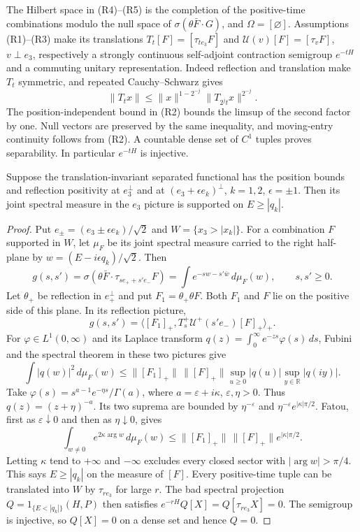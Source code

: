 \documentclass[11pt,letterpaper,reqno]{amsart}
\makeatletter
\theoremstyle{definition}
\newcommand{\ms@minorstart}{%
  \pushQED{\qed}\renewcommand{\qedsymbol}{$\blacksquare$}}
\newenvironment{proposition}[1][]{\ms@minorstart\ms@proposition[#1]}
  {\popQED\endms@proposition}
\theoremstyle{remark}
\makeatother
\begin{document}
The Hilbert space in (R4)--(R5) is the completion of the
positive-time combinations modulo the null space of
$\sigma(\theta\bar F\cdot G)$, and $\Omega=[\varnothing]$.
Assumptions (R1)--(R3) make its translations
$T_t[F]=[\tau_{te_3}F]$ and
$\mathcal U(v)[F]=[\tau_vF]$, $v\perp e_3$, respectively
a strongly continuous self-adjoint contraction semigroup
$e^{-tH}$ and a commuting unitary representation.
Indeed reflection and translation make $T_t$ symmetric,
and repeated Cauchy--Schwarz gives
\[
 \|T_tx\|\le\|x\|^{1-2^{-j}}
                    \|T_{2^jt}x\|^{2^{-j}}.
\]
The position-independent bound in (R2) bounds the limsup
of the second factor by one. Null vectors are preserved by the
same inequality, and moving-entry continuity follows
from (R2).  A countable dense set of $C^1$ tuples proves
separability.  In particular $e^{-tH}$ is injective.

\begin{proposition}[The two-plane spectral inequality]\label{C-389-28}
Suppose the translation-invariant separated functional has the
position bounds and reflection positivity at $e_3^\perp$ and
at $(e_3+\epsilon e_k)^\perp$, $k=1,2$, $\epsilon=\pm1$.
Then its joint spectral measure in the $e_3$ picture is
supported on $E\ge|q_k|$.
\end{proposition}
\begin{proof}
Put $e_\pm=(e_3\pm\epsilon e_k)/\sqrt2$ and
$W=\{x_3>|x_k|\}$. For a combination $F$ supported in $W$,
let $\mu_F$ be its joint spectral measure carried to the
right half-plane by $w=(E-i\epsilon q_k)/\sqrt2$. Then
\[
 g(s,s')=\sigma(\theta\bar F\cdot
                  \tau_{se_++s'e_-}F)
        =\int e^{-sw-s'\bar w}\,d\mu_F(w),\qquad s,s'\ge0.
\]
Let $\theta_+$ be reflection in $e_+^\perp$ and put
$F_1=\theta_+\theta F$. Both $F_1$ and $F$ lie on the
positive side of this plane. In its reflection picture,
\[
 g(s,s')=\langle[F_1]_+,T_s^+\mathcal U^+(s'e_-)[F]_+\rangle_+.
\]
For $\varphi\in L^1(0,\infty)$ and its Laplace transform
$q(z)=\int_0^\infty e^{-zs}\varphi(s)\,ds$, Fubini and
the spectral theorem in these two pictures give
\[
 \int|q(w)|^2\,d\mu_F(w)
 \le\|[F_1]_+\|\,\|[F]_+\|
        \sup_{u\ge0}|q(u)|\sup_{y\in\mathbb R}|q(iy)|.
\]
Take $\varphi(s)=s^{a-1}e^{-\eta s}/\Gamma(a)$, where
$a=\varepsilon+i\kappa$, $\varepsilon,\eta>0$.
Thus $q(z)=(z+\eta)^{-a}$. Its two suprema are bounded by
$\eta^{-\varepsilon}$ and
$\eta^{-\varepsilon}e^{|\kappa|\pi/2}$. Fatou, first as
$\varepsilon\downarrow0$ and then as $\eta\downarrow0$, gives
\[
 \int_{w\ne0}e^{2\kappa\arg w}\,d\mu_F(w)
       \le\|[F_1]_+\|\,\|[F]_+\|e^{|\kappa|\pi/2}.
\]
Letting $\kappa$ tend to $+\infty$ and $-\infty$ excludes
every closed sector with $|\arg w|>\pi/4$. This says
$E\ge|q_k|$ on the measure of $[F]$.
Every positive-time tuple can be translated into $W$ by
$\tau_{re_3}$ for large $r$. The bad spectral projection
$Q=1_{\{E<|q_k|\}}(H,P)$ then satisfies
$e^{-rH}Q[X]=Q[\tau_{re_3}X]=0$. The semigroup is
injective, so $Q[X]=0$ on a dense set and hence $Q=0$.
\end{proof}
\end{document}
